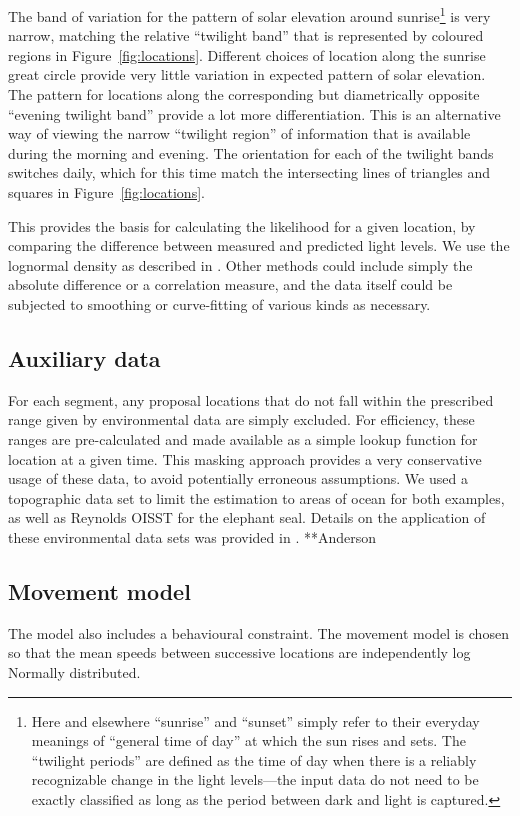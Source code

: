 \documentclass[10pt]{article}
\begin{document}
The band of variation for the pattern of solar elevation around
sunrise\footnote{Here and elsewhere ``sunrise'' and ``sunset'' simply
  refer to their everyday meanings of ``general time of day'' at which
  the sun rises and sets. The ``twilight periods'' are defined as the
  time of day when there is a reliably recognizable change in the
  light levels---the input data do not need to be exactly classified
  as long as the period between dark and light is captured.}  is very
narrow, matching the relative ``twilight band'' that is represented by
coloured regions in Figure~\ref{fig:locations}. Different choices of
location along the sunrise great circle provide very little variation
in expected pattern of solar elevation. The pattern for locations
along the corresponding but diametrically opposite ``evening twilight
band'' provide a lot more differentiation. This is an alternative way
of viewing the narrow ``twilight region'' of information that is
available during the morning and evening. The orientation for each of
the twilight bands switches daily, which for this time match the
intersecting lines of triangles and squares in
Figure~\ref{fig:locations}.

This provides the basis for calculating the likelihood for a given
location, by comparing the difference between measured and predicted
light levels.  We use the lognormal density as described in
\cite{sumner2009}. Other methods could include simply the absolute
difference or a correlation measure, and the data itself could be
subjected to smoothing or curve-fitting of various kinds as necessary.

\subsection*{Auxiliary data} For each segment, any proposal locations
that do not fall within the prescribed range given by environmental
data are simply excluded. For efficiency, these ranges are
pre-calculated and made available as a simple lookup function for
location at a given time. This masking approach provides a very
conservative usage of these data, to avoid potentially erroneous
assumptions. We used a topographic data set to limit the estimation to
areas of ocean for both examples, as well as Reynolds OISST for the
elephant seal. Details on the application of these environmental data
sets was provided in \cite{sumner2009}. **Anderson

\subsection*{Movement model} The model also includes a behavioural
constraint. The movement model is chosen so that the mean speeds
between successive locations are independently log Normally
distributed.
\end{document}
